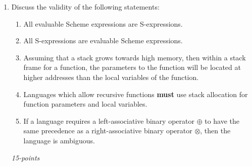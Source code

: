 \documentclass[12pt]{article}
\begin{document}
\begin{enumerate}
\newpage

\item Discuss the validity of the following statements:

  \begin{enumerate}

  \item All evaluable Scheme expressions are S-expressions.

  \item All S-expressions are evaluable Scheme expressions.

  \item Assuming that a stack grows towards high memory, then within a
    stack frame for a function, the parameters to the function will be
    located at higher addresses than the local variables of the
    function.

  \item Languages which allow recursive functions \textbf{must} use
    stack allocation for function parameters and local variables.

  \item If a language requires a left-associative binary operator $\oplus$
    to have the same precedence as a right-associative binary operator
    $\otimes$, then the language is ambiguous.

    \end{enumerate}
\hfill\textit{15-points}

\end{enumerate}
\end{document}
